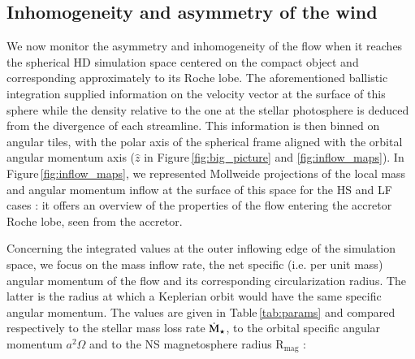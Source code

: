 \documentclass{aa}
\makeatletter
\newcommand*{\ns}{NS\@\xspace}
\newcommand*{\eg}{e.g.\@\xspace}
\newcommand*{\ie}{i.e.\@\xspace}
\newcommand*{\aka}{a.k.a. \@\xspace}
\newcommand{\mystar}{{\fontfamily{lmr}\selectfont$\star$}}
\makeatother
\begin{document}
\subsection{Inhomogeneity and asymmetry of the wind}
\label{sec:orb_inhomo}

We now monitor the asymmetry and inhomogeneity of the flow when it reaches the spherical HD simulation space centered on the compact object and corresponding approximately to its Roche lobe. The aforementioned ballistic integration supplied information on the velocity vector at the surface of this sphere while the density relative to the one at the stellar photosphere is deduced from the divergence of each streamline. This information is then binned on angular tiles, with the polar axis of the spherical frame aligned with the orbital angular momentum axis ($\hat{z}$ in Figure\,\ref{fig:big_picture} and \ref{fig:inflow_maps}). In Figure\,\ref{fig:inflow_maps}, we represented Mollweide projections of the local mass and angular momentum inflow at the surface of this space for the HS and LF cases : it offers an overview of the properties of the flow entering the accretor Roche lobe, seen from the accretor. 

Concerning the integrated values at the outer inflowing edge of the simulation space, we focus on the mass inflow rate, the net specific (\ie per unit mass) angular momentum of the flow and its corresponding circularization radius. The latter is the radius at which a Keplerian orbit would have the same specific angular momentum. The values are given in Table\,\ref{tab:params} and compared respectively to the stellar mass loss rate $\dot{\text{M}}_{\text{\mystar}}$, to the orbital specific angular momentum $a^2\Omega$ and to the \ns magnetosphere radius R$_{\text{mag}}$ \citep[see \eg][]{Frank2002} :


\end{document}
